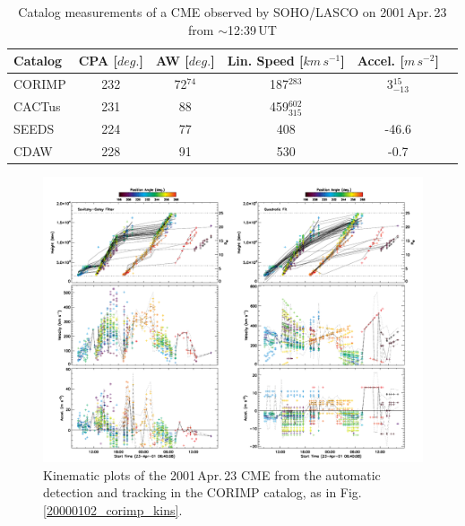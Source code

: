 \documentclass[referee,a4paper,12pt,traditabstract]{swsc}
\begin{document}
\begin{linenumbers}
\begin{table}[h]
\begin{tabular}{l*{4}{c}r}
Catalog              & CPA [$deg.$] & AW [$deg.$] & Lin. Speed [$km\,s^{-1}$] & Accel. [$m\,s^{-2}$]  \\
\hline
CORIMP   & 232 & 72$^{74}$ & 187$^{283}$ & 3$_{-13}^{15}$ \\
CACTus  & 231 & 88 & 459$_{315}^{602}$ &  \\
SEEDS    & 224 & 77 & 408 & -46.6  \\
CDAW      & 228 & 91 & 530 & -0.7 \\
\end{tabular}
\caption{Catalog measurements of a CME observed by SOHO/LASCO on 2001\,Apr.\,23 from $\sim$12:39\,UT}
\label{table_20010423}
\end{table}

\begin{figure}[t]
\centerline{\includegraphics[width=\linewidth]{images/20010423_corimp_kins.pdf}}
\caption{Kinematic plots of the 2001\,Apr.\,23 CME from the automatic detection and tracking in the CORIMP catalog, as in Fig.\,\ref{20000102_corimp_kins}.}
\label{20010423_corimp_kins}
\end{figure}



\end{linenumbers}
\end{document}
